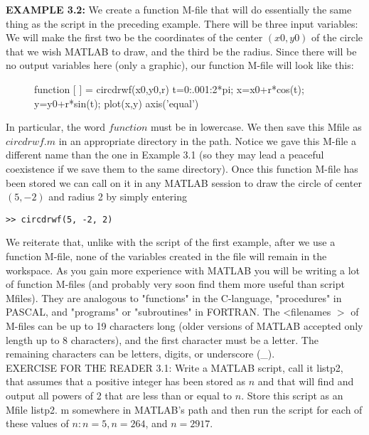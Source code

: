 \documentclass[../main.tex]{subfiles}
\begin{document}
\textbf{EXAMPLE 3.2:} We create a function M-file that will do essentially the same thing as the script in the preceding example. There will be three input variables: We will make the first two be the coordinates of the center $(x 0, y 0)$ of the circle that we wish MATLAB to draw, and the third be the radius. Since there will be no output variables here (only a graphic), our function M-file will look like this:

\begin{figure}[H]
\centering
\begin{boxedverbatim}
function [ ] = circdrwf(x0,y0,r)
 t=0:.001:2*pi;
x=x0+r*cos(t);
y=y0+r*sin(t);
plot(x,y)
axis('equal')
\end{boxedverbatim}
\end{figure}


In particular, the word $function$ must be in lowercase. We then save this Mfile as $circdrwf.m$ in an appropriate directory in the path. Notice we gave this M-file a different name than the one in Example 3.1 (so they may lead a peaceful coexistence if we save them to the same directory). Once this function M-file has been stored we can call on it in any MATLAB session to draw the circle of center $(5,-2)$ and radius 2 by simply entering

\begin{verbatim}
>> circdrwf(5, -2, 2) 
\end{verbatim}

We reiterate that, unlike with the script of the first example, after we use a function M-file, none of the variables created in the file will remain in the workspace. As you gain more experience with MATLAB you will be writing a lot of function M-files (and probably very soon find them more useful than script Mfiles). They are analogous to "functions" in the C-language, "procedures" in PASCAL, and "programs" or "subroutines" in FORTRAN. The <filenames $>$ of M-files can be up to 19 characters long (older versions of MATLAB accepted only length up to 8 characters), and the first character must be a letter. The remaining characters can be letters, digits, or underscore (\_). \\


EXERCISE FOR THE READER 3.1: Write a MATLAB script, call it listp2, that assumes that a positive integer has been stored as $n$ and that will find and output all powers of 2 that are less than or equal to $n$. Store this script as an Mfile listp2. $\mathrm{m}$ somewhere in MATLAB's path and then run the script for each of these values of $n: n=5, n=264$, and $n=2917$.\\
\end{document}
